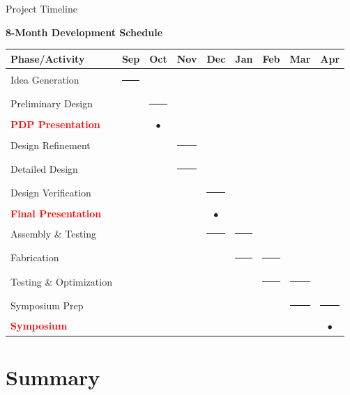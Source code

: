\documentclass[aspectratio=169]{beamer}
\begin{document}
\begin{frame}{Project Timeline}
\begin{center}
\Large \textbf{8-Month Development Schedule}

\vspace{0.5cm}
\footnotesize
\begin{tabular}{lcccccccc}
\toprule
\textbf{Phase/Activity} & \textbf{Sep} & \textbf{Oct} & \textbf{Nov} & \textbf{Dec} & \textbf{Jan} & \textbf{Feb} & \textbf{Mar} & \textbf{Apr} \\
\midrule
Idea Generation & \rule{1cm}{0.3cm} & & & & & & & \\
Preliminary Design & & \rule{0.8cm}{0.3cm} & & & & & & \\
\textcolor{red}{\textbf{PDP Presentation}} & & \textbf{$\bullet$} & & & & & & \\
Design Refinement & & & \rule{0.8cm}{0.3cm} & & & & & \\
Detailed Design & & & \rule{0.8cm}{0.3cm} & & & & & \\
Design Verification & & & & \rule{0.8cm}{0.3cm} & & & & \\
\textcolor{red}{\textbf{Final Presentation}} & & & & \textbf{$\bullet$} & & & & \\
Assembly \& Testing & & & & \rule{0.8cm}{0.3cm} & \rule{0.8cm}{0.3cm} & & & \\
Fabrication & & & & & \rule{0.8cm}{0.3cm} & \rule{0.8cm}{0.3cm} & & \\
Testing \& Optimization & & & & & & \rule{0.8cm}{0.3cm} & \rule{0.8cm}{0.3cm} & \\
Symposium Prep & & & & & & & \rule{0.8cm}{0.3cm} & \rule{0.8cm}{0.3cm} \\
\textcolor{red}{\textbf{Symposium}} & & & & & & & & \textbf{$\bullet$} \\
\bottomrule
\end{tabular}
\end{center}
\end{frame}

\section{Summary}
\end{document}
